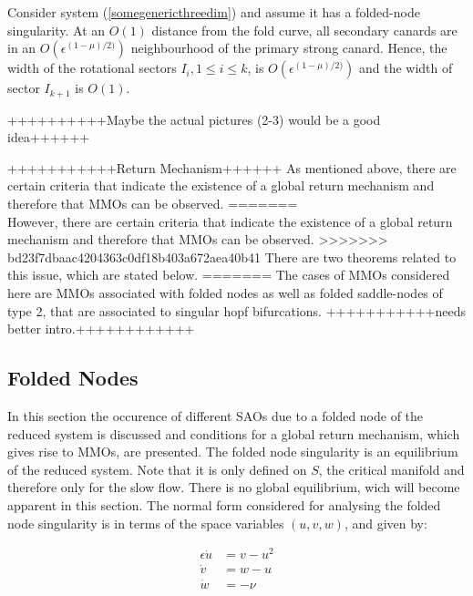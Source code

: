 \begin{theorem}
Consider system (\ref{somegenericthreedim}) and assume it has a folded-node singularity. At an $O(1)$ distance from the fold curve, all secondary canards are in an $O(\epsilon^{(1- \mu)/2)})$ neighbourhood of the primary strong canard. Hence, the width of the  rotational sectors $I_i, 1 \leq i \leq k$, is $O(\epsilon^{(1- \mu)/2)})$ and the width of sector $I_{k+1}$ is $O(1)$.
\end{theorem}

++++++++++Maybe the actual pictures (2-3) would be a good idea++++++ 

+++++++++++Return Mechanism++++++
As mentioned above, there are certain criteria that indicate the existence of a global return mechanism and therefore that MMOs can be observed.
=======
\\
However, there are certain criteria that indicate the existence of a global return mechanism and therefore that MMOs can be observed.
>>>>>>> bd23f7dbaac4204363c0df18b403a672aea40b41
There are two theorems related to this issue, which are stated below.
=======
The cases of MMOs considered here are MMOs associated with folded nodes as well as folded saddle-nodes of type 2, that are associated to singular hopf bifurcations.
+++++++++++needs better intro.++++++++++++

\subsection{ Folded Nodes}
In this section the occurence of different SAOs due to a folded node of the reduced system is discussed and conditions for a global return mechanism, which gives rise to MMOs, are presented.
The folded node singularity is an equilibrium of the reduced system. Note that it is only defined on $S$, the critical manifold and therefore only for the slow flow. There is no global equilibrium, wich will become apparent in this section.
The normal form considered for analysing the folded node singularity is in terms of the space variables $(u,v,w)$, and given by:

\begin{align*}
\epsilon \dot{u} &= v - u^2\\
\dot{v} &= w-u\\
\dot{w} &= - \nu
\end{align*}

